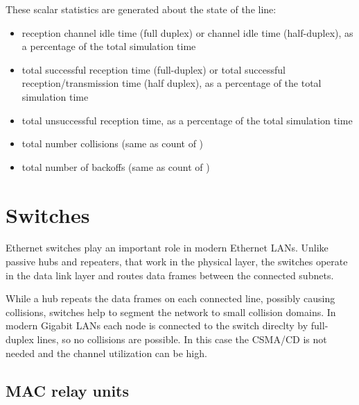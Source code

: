 These scalar statistics are generated about the state of the line:
\begin{itemize}
  \item {} reception channel idle time (full duplex) or channel
         idle time (half-duplex), as a percentage of the total simulation time
  \item {} total successful reception time (full-duplex) or total
         successful reception/transmission time (half duplex), as a percentage
         of the total simulation time
  \item {} total unsuccessful reception time, as a percentage
         of the total simulation time
  \item {} total number collisions (same as count of )
  \item {} total number of backoffs (same as count of )
\end{itemize}




\section{Switches}

Ethernet switches play an important role in modern Ethernet LANs. Unlike
passive hubs and repeaters, that work in the physical layer, the switches
operate in the data link layer and routes data frames between the connected
subnets.

While a hub repeats the data frames on each connected line, possibly causing
collisions, switches help to segment the network to small collision domains.
In modern Gigabit LANs each node is connected to the switch direclty
by full-duplex lines, so no collisions are possible. In this case the
CSMA/CD is not needed and the channel utilization can be high.

\subsection{MAC relay units}

